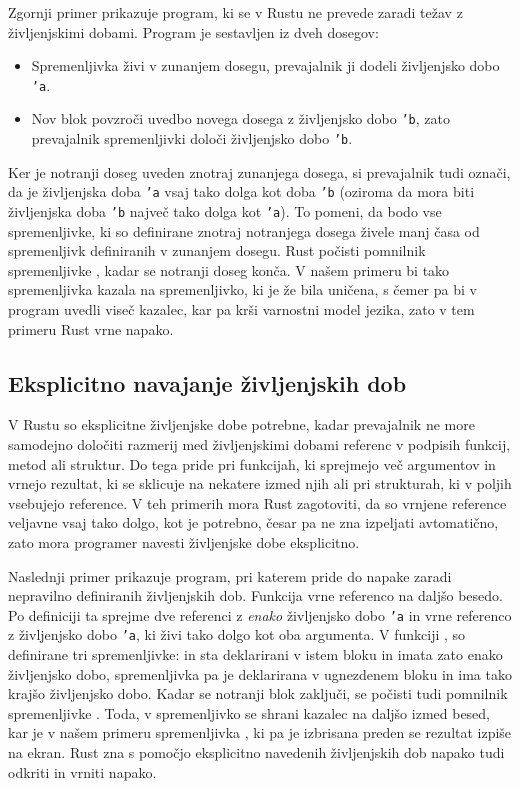 Zgornji primer prikazuje program, ki se v Rustu ne prevede zaradi težav z življenjskimi dobami. Program je sestavljen iz dveh dosegov:
\begin{itemize}
	\itemsep 0em
	\item Spremenljivka  živi v zunanjem dosegu, prevajalnik ji dodeli živ\-ljen\-jsko dobo \texttt{'a}.
	\item Nov blok povzroči uvedbo novega dosega z živ\-ljenj\-sko dobo \texttt{'b}, zato prevajalnik spremenljivki  določi živ\-ljenj\-sko dobo \texttt{'b}.
\end{itemize}

Ker je notranji doseg uveden znotraj zunanjega dosega, si prevajalnik tudi označi, da je življenjska doba \texttt{'a} vsaj tako dolga kot doba \texttt{'b} (oziroma da mora biti življenjska doba \texttt{'b} največ tako dolga kot \texttt{'a}). To pomeni, da bodo vse spremenljivke, ki so definirane znotraj notranjega dosega živele manj časa od spremenljivk definiranih v zunanjem dosegu. Rust počisti pomnilnik spremenljivke , kadar se notranji doseg konča. V našem primeru bi tako spremenljivka  kazala na spremenljivko, ki je že bila uničena, s čemer pa bi v program uvedli viseč kazalec, kar pa krši varnostni model jezika, zato v tem primeru Rust vrne napako.

\subsection{Eksplicitno navajanje življenjskih dob}

V Rustu so eksplicitne življenjske dobe potrebne, kadar prevajalnik ne more samodejno določiti razmerij med življenjskimi dobami referenc v podpisih funkcij, metod ali struktur. Do tega pride pri funkcijah, ki sprejmejo več argumentov in vrnejo rezultat, ki se sklicuje na nekatere izmed njih ali pri strukturah, ki v poljih vsebujejo reference. V teh primerih mora Rust zagotoviti, da so vrnjene reference veljavne vsaj tako dolgo, kot je potrebno, česar pa ne zna izpeljati avtomatično, zato mora programer navesti življenjske dobe eksplicitno.

Naslednji primer prikazuje program, pri katerem pride do napake zaradi nepravilno definiranih življenjskih dob.  Funkcija  vrne referenco na daljšo besedo. Po definiciji ta sprejme dve referenci z \emph{enako} življenjsko dobo \texttt{'a} in vrne referenco z življenjsko dobo \texttt{'a}, ki živi tako dolgo kot oba argumenta. V funkciji , so definirane tri spremenljivke:  in  sta deklarirani v istem bloku in imata zato enako življenjsko dobo, spremenljivka  pa je deklarirana v ugnezdenem bloku in ima tako krajšo življenjsko dobo. Kadar se notranji blok zaključi, se počisti tudi pomnilnik spremenljivke . Toda, v spremenljivko  se shrani kazalec na daljšo izmed besed, kar je v našem primeru spremenljivka , ki pa je izbrisana preden se rezultat izpiše na ekran. Rust zna s pomočjo eksplicitno navedenih življenjskih dob napako tudi odkriti in vrniti napako.

